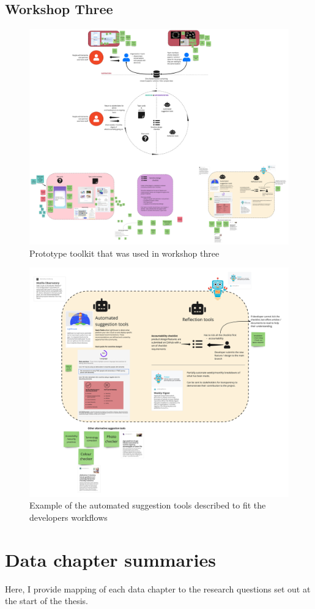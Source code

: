 \newpage
\section{Workshop Three}
\label{D3:W3}
\begin{figure}[htp]
    \centering
    \includegraphics[width=0.6\linewidth]{Images/Appendix/D3Toolkit/Workshop3-Overall.jpg}
    \caption{Prototype toolkit that was used in workshop three}
    \label{fig:App:W3}
\end{figure}

\begin{figure}[htp]
    \centering
    \includegraphics[width=0.6\linewidth]{Images/Appendix/D3Toolkit/Workshop3Creation.jpg}
    \caption{Example of the automated suggestion tools described to fit the developers workflows}
    \label{fig:App:W3-AutomtedTools}
\end{figure}


\chapter{Data chapter summaries}
\label{Appendix:ResearchQuestionsMapped}
Here, I provide mapping of each data chapter to the research questions set out at the start of the thesis.

